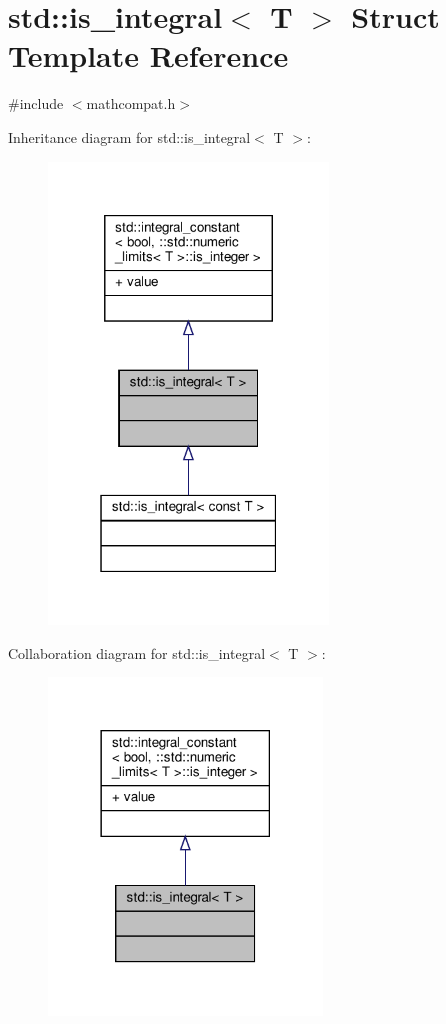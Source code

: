 \hypertarget{structstd_1_1is__integral}{}\section{std\+:\+:is\+\_\+integral$<$ T $>$ Struct Template Reference}
\label{structstd_1_1is__integral}


{\ttfamily \#include $<$mathcompat.\+h$>$}



Inheritance diagram for std\+:\+:is\+\_\+integral$<$ T $>$\+:\nopagebreak
\begin{figure}[H]
\begin{center}
\leavevmode
\includegraphics[width=211pt]{d6/def/structstd_1_1is__integral__inherit__graph}
\end{center}
\end{figure}


Collaboration diagram for std\+:\+:is\+\_\+integral$<$ T $>$\+:\nopagebreak
\begin{figure}[H]
\begin{center}
\leavevmode
\includegraphics[width=206pt]{d0/d6b/structstd_1_1is__integral__coll__graph}
\end{center}
\end{figure}
